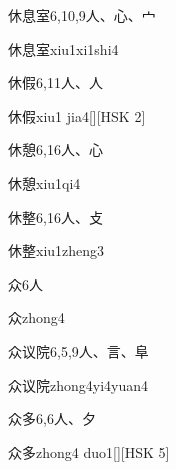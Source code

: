 \begin{entry}{休息室}{6,10,9}{⼈、⼼、⼧}
  \begin{phonetics}{休息室}{xiu1xi1shi4}
  \end{phonetics}
\end{entry}

\begin{entry}{休假}{6,11}{⼈、⼈}
  \begin{phonetics}{休假}{xiu1 jia4}[][HSK 2]
  \end{phonetics}
\end{entry}

\begin{entry}{休憩}{6,16}{⼈、⼼}
  \begin{phonetics}{休憩}{xiu1qi4}
  \end{phonetics}
\end{entry}

\begin{entry}{休整}{6,16}{⼈、⽁}
  \begin{phonetics}{休整}{xiu1zheng3}
  \end{phonetics}
\end{entry}

\begin{entry}{众}{6}{⼈}
  \begin{phonetics}{众}{zhong4}
  \end{phonetics}
\end{entry}

\begin{entry}{众议院}{6,5,9}{⼈、⾔、⾩}
  \begin{phonetics}{众议院}{zhong4yi4yuan4}
  \end{phonetics}
\end{entry}

\begin{entry}{众多}{6,6}{⼈、⼣}
  \begin{phonetics}{众多}{zhong4 duo1}[][HSK 5]
  \end{phonetics}
\end{entry}


